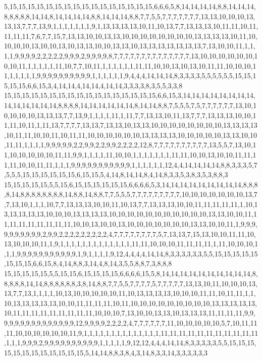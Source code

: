 5,15,15,15,15,15,15,15,15,15,15,15,15,15,15,15,15,6,6,6,5,8,14,14,14,14,8,8,14,14,14,8,8,8,8,8,14,14,8,14,14,14,14,8,8,14,14,14,8,8,7,7,5,5,7,7,7,7,7,7,7,13,13,10,10,10,13,13,13,7,7,7,13,9,1,1,1,1,1,1,1,9,1,13,13,13,13,10,11,10,13,7,7,13,13,13,10,11,11,10,11,11,11,11,7,6,7,7,15,7,13,13,10,10,13,13,10,10,10,10,10,10,10,10,13,13,13,13,10,11,10,10,10,10,13,10,10,13,10,13,13,10,10,13,13,10,13,13,13,13,13,13,13,7,13,10,10,11,1,1,1,1,9,9,9,9,2,2,2,2,2,9,9,9,2,9,9,9,9,8,7,7,7,7,7,7,7,7,7,7,7,7,7,7,13,10,10,10,10,10,10,10,10,11,1,1,1,1,1,11,10,7,7,10,11,1,1,1,1,1,1,11,11,10,10,13,10,13,10,11,11,10,10,10,11,1,1,1,1,1,9,9,9,9,9,9,9,9,9,9,1,1,1,1,1,1,9,4,4,4,14,14,14,8,3,3,3,3,5,5,5,5,5,5,15,15,15,15,15,6,6,15,3,4,14,14,4,14,14,4,14,14,3,3,3,3,8,3,5,5,3,3,8
15,15,15,15,15,15,15,15,15,15,15,15,15,15,15,15,15,6,6,15,3,14,14,14,14,14,14,14,14,14,14,14,14,14,14,8,8,8,8,14,14,14,14,14,14,8,14,14,8,8,7,5,5,5,7,5,7,7,7,7,7,7,13,10,10,10,10,10,13,13,13,7,7,13,9,1,1,1,1,11,1,11,7,7,13,13,10,11,13,7,7,7,13,13,13,10,10,11,11,10,11,1,11,13,7,7,7,7,13,13,7,13,13,10,13,13,10,10,10,10,10,10,10,10,13,13,13,13,10,11,11,10,10,11,10,11,11,10,10,10,10,10,10,13,13,13,13,10,10,10,10,10,13,13,10,10,11,11,1,1,1,1,9,9,9,9,9,2,2,9,9,2,2,9,9,2,2,2,2,12,8,7,7,7,7,7,7,7,7,7,7,13,5,5,7,13,10,11,10,10,10,10,10,11,11,9,9,1,1,1,1,11,10,10,1,1,1,1,1,1,1,11,11,10,10,13,10,10,11,11,11,11,10,10,11,11,1,1,1,9,9,9,9,9,9,9,9,9,9,9,1,1,1,1,1,1,12,4,4,14,14,14,14,8,8,3,3,3,5,7,5,5,5,15,15,15,15,15,15,6,15,15,5,4,14,8,14,14,8,4,14,8,3,3,5,3,8,3,5,3,8,8,3
15,15,15,15,15,5,5,15,6,15,15,15,15,15,15,6,6,6,6,5,3,14,14,14,14,14,14,14,14,14,8,8,8,8,14,8,8,8,8,8,8,8,8,14,8,8,14,8,8,7,7,5,5,5,7,7,7,7,7,7,7,7,7,10,10,10,10,10,10,10,13,7,7,13,10,1,1,1,10,7,7,13,13,13,10,10,11,10,13,7,7,13,13,13,10,10,11,11,11,11,11,1,10,13,13,13,13,13,10,10,10,13,13,13,13,10,10,10,10,10,10,10,10,10,10,10,13,13,10,10,11,11,11,11,11,11,11,11,11,10,10,13,10,10,13,10,10,10,10,10,10,10,13,13,10,10,11,1,9,9,9,9,9,9,9,9,9,9,2,9,9,2,2,2,2,2,2,2,2,2,4,7,7,7,7,7,7,7,7,5,7,13,13,7,15,13,10,10,11,11,10,13,10,10,10,11,1,9,1,1,1,1,1,1,1,1,1,1,1,1,1,11,11,10,10,10,11,11,11,11,1,11,10,10,10,1,1,1,9,9,9,9,9,9,9,9,9,9,9,1,9,1,1,1,1,9,12,4,4,4,4,14,14,8,3,3,3,3,3,3,5,5,15,15,15,15,15,15,15,15,6,6,15,8,4,14,8,8,3,14,4,8,14,3,5,5,8,8,7,3,8,8,8
15,15,15,15,15,5,5,15,15,6,15,15,15,15,6,6,6,6,15,5,8,14,14,14,14,14,14,14,14,14,14,8,8,8,8,8,14,14,8,8,8,8,8,8,3,8,14,8,8,7,7,5,5,7,7,7,7,5,7,7,7,7,7,13,13,10,11,10,10,10,13,13,7,7,13,1,1,1,1,10,13,10,10,10,10,10,11,10,13,13,13,13,10,10,10,11,11,10,11,11,1,1,10,13,13,13,13,13,10,10,11,11,11,11,10,11,10,10,10,10,10,10,10,10,10,13,13,13,13,13,10,11,11,11,11,11,11,11,11,11,10,10,10,7,13,10,10,13,13,10,13,13,13,11,11,11,11,9,9,9,9,9,9,9,9,9,9,9,9,9,9,9,12,9,9,9,9,2,2,2,2,4,7,7,7,7,7,7,11,10,10,10,10,10,5,7,10,11,11,11,10,10,10,10,10,10,11,9,1,1,1,1,1,1,1,1,1,1,1,1,1,1,11,11,11,11,11,11,11,11,11,11,11,1,1,1,9,9,9,2,9,9,9,9,9,9,9,9,9,9,1,1,1,1,1,9,12,12,4,4,4,14,14,8,3,3,3,3,3,5,5,15,15,15,15,15,15,15,15,15,15,15,15,5,14,14,8,8,3,8,4,3,14,8,3,3,14,3,3,3,3,3,3

